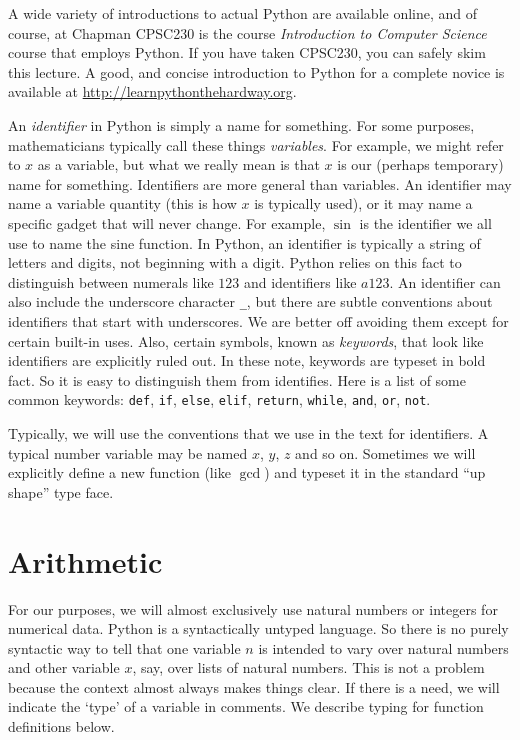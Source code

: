 A wide variety of introductions to actual Python are available online,
and of course, at Chapman CPSC230 is the course \emph{Introduction to
	Computer Science} course that employs Python. If you have taken
CPSC230, you can safely skim this lecture.  A good, and concise
introduction to Python for a complete novice is available at
\url{http://learnpythonthehardway.org}.

An \emph{identifier} in Python is simply a name for something. For
some purposes, mathematicians typically call these things
\emph{variables}. For example, we might refer to $x$ as a variable,
but what we really mean is that $x$ is our (perhaps temporary) name for something. Identifiers are more general than variables. An identifier may name a variable quantity (this is how $x$ is typically used), or it may name a specific gadget that will never change. For example, $\sin$ is the identifier we all use to name the sine function.  In Python, an identifier is
typically a string of letters and digits, not beginning with a
digit. Python relies on this fact to distinguish between numerals like
$123$ and identifiers like $a123$.  An identifier can also include the
underscore character \verb+_+, but there are subtle conventions about
identifiers that start with underscores. We are better off avoiding them
except for certain built-in uses. Also, certain symbols, known as
\emph{keywords}, that look like identifiers are explicitly ruled
out. In these note, keywords are typeset in bold fact. So it is easy
to distinguish them from identifies. Here is a list of some common
keywords: \lstinline|def|, \lstinline|if|, \lstinline|else|,
\lstinline|elif|, \lstinline|return|, 
\lstinline|while|, \lstinline|and|, \lstinline|or|, \lstinline|not|.

Typically, we will use the conventions that we use in the text for
identifiers. A typical number variable may be named $x$, $y$, $z$ and
so on. Sometimes we will explicitly define a new function (like
$\gcd$) and typeset it in the standard ``up shape'' type face.

\ipadbreak

\section{Arithmetic}

For our purposes, we will almost exclusively use natural numbers or integers for numerical data. 
Python is a syntactically untyped language. 
So there is no purely syntactic way to tell that one variable $n$ is intended to vary over natural numbers and other variable $x$, say,  over lists of natural numbers. 
This is not a problem because the context almost always makes things clear. 
If there is a need, we will indicate the `type' of a variable in comments. 
We describe typing for function definitions below.

